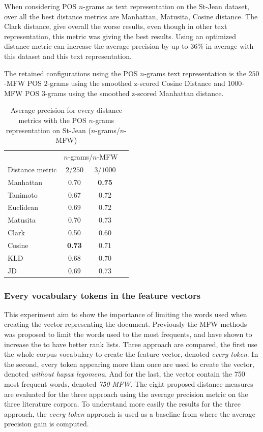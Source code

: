 When considering POS $n$-grams as text representation on the St-Jean dataset, over all the best distance metrics are Manhattan, Matusita, Cosine distance.
The Clark distance, give overall the worse results, even though in other text representation, this metric was giving the best results.
Using an optimized distance metric can increase the average precision by up to $36$\% in average with this dataset and this text representation.

The retained configurations using the POS $n$-grams text representation is the $250$-MFW POS $2$-grams using the smoothed z-scored Cosine Distance and $1000$-MFW POS $3$-grams using the smoothed z-scored Manhattan distance.

\begin{table}
  \centering
  \caption{Average precision for every distance metrics with the POS $n$-grams representation on St-Jean ($n$-grams/$n$-MFW)}
  \label{tab:pos_ngrams}
  \begin{tabular}{l c c c}
    \toprule
                    & \multicolumn{2}{c}{$n$-grams/$n$-MFW} \\
    Distance metric & $2$/$250$ & $3$/$1000$ \\
    \midrule
    Manhattan & 0.70 & \textbf{0.75} \\
    Tanimoto & 0.67 & 0.72 \\
    Euclidean & 0.69 & 0.72 \\
    Matusita & 0.70 & 0.73 \\
    Clark & 0.50 & 0.60 \\
    Cosine & \textbf{0.73} & 0.71 \\
    KLD & 0.68 & 0.70 \\
    JD & 0.69 & 0.73 \\
    \bottomrule
  \end{tabular}
\end{table}

\subsubsection{Every vocabulary tokens in the feature vectors}

This experiment aim to show the importance of limiting the words used when creating the vector representing the document.
Previously the MFW methods was proposed to limit the words used to the most frequents, and have shown to increase the
to have better rank lists.
Three approach are compared, the first use the whole corpus vocabulary to create the feature vector, denoted \textit{every token}.
In the second, every token appearing more than once are used to create the vector, denoted \textit{without hapax legomena}.
And for the last, the vector contain the 750 most frequent words, denoted \textit{750-MFW}.
The eight proposed distance measures are evaluated for the three approach using the average precision metric on the three literature corpora.
To understand more easily the results for the three approach, the \textit{every token} approach is used as a baseline from where the average precision gain is computed.

